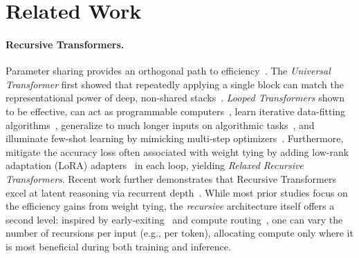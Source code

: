 \section{Related Work}
\label{sec:related_work}



\paragraph{Recursive Transformers.}
Parameter sharing provides an orthogonal path to efficiency~\citep{dehghani2018universal,lan2019albert0,xia2019tied,jaegle2021perceiver,takase2021lessons,tan2023sparse,ng2024loop,bae2024relaxed}.
%
The \textit{Universal Transformer} first showed that repeatedly applying a single block can match the representational power of deep, non-shared stacks~\citep{dehghani2018universal}. 
%
\textit{Looped Transformers} shown to be effective, can act as programmable computers~\citep{giannou2023looped}, learn iterative data-fitting algorithms~\citep{yang2023looped}, generalize to much longer inputs on algorithmic tasks~\citep{fan2024looped}, and illuminate few-shot learning by mimicking multi-step optimizers~\citep{gatmiry2024can}.
%
Furthermore, \citet{bae2024relaxed} mitigate the accuracy loss often associated with weight tying by adding low-rank adaptation (LoRA) adapters~\citep{hu2022lora} in each loop, yielding \emph{Relaxed Recursive Transformers}. 
Recent work further demonstrates that Recursive Transformers excel at latent reasoning via recurrent depth~\citep{geiping2025scaling}.  
While most prior studies focus on the efficiency gains from weight tying, the \emph{recursive} architecture itself offers a second level: inspired by early-exiting~\citep{schuster2022confident} and compute routing~\citep{raposo2024mixture}, one can vary the number of recursions per input (e.g., per token), allocating compute only where it is most beneficial during both training and inference.



